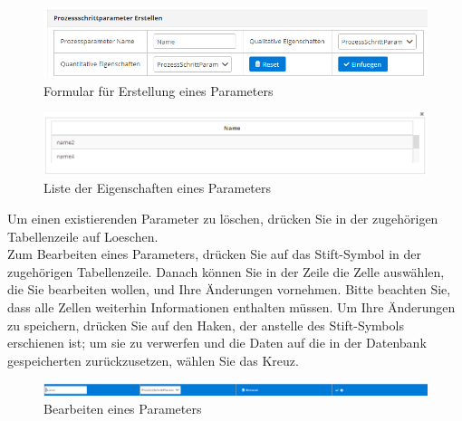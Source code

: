 \documentclass[enabledeprecatedfontcommands,fontsize=12pt,paper=a4,twoside]{scrartcl}
\begin{document}
\begin{figure}[h!]
\begin{center}
 \includegraphics[width=\textwidth]{screenshots/pk/prozessschrittparameterform.png}
  \caption{Formular für Erstellung eines Parameters}
  \label{fig:boat2}
\end{center}
\end{figure}


\begin{figure}[h!]
\begin{center}
 \includegraphics[width=\textwidth]{screenshots/pk/prozessschrittparametereigen.png}
  \caption{Liste der Eigenschaften eines Parameters}
  \label{fig:boat2}
\end{center}
\end{figure}

Um einen existierenden Parameter zu löschen, drücken Sie in der zugehörigen Tabellenzeile auf Loeschen. \\

Zum Bearbeiten eines Parameters, drücken Sie auf das Stift-Symbol in der zugehörigen Tabellenzeile. Danach können Sie in der Zeile die Zelle auswählen, die Sie bearbeiten wollen, und Ihre Änderungen vornehmen. Bitte beachten Sie, dass alle Zellen weiterhin Informationen enthalten müssen. Um Ihre Änderungen zu speichern, drücken Sie auf den Haken, der anstelle des Stift-Symbols erschienen ist; um sie zu verwerfen und die Daten auf die in der Datenbank gespeicherten zurückzusetzen, wählen Sie das Kreuz. \\

\begin{figure}[h!]
\begin{center}
 \includegraphics[width=\textwidth]{screenshots/pk/prozessschrittparameteredit.png}
  \caption{Bearbeiten eines Parameters}
  \label{fig:boat2}
\end{center}
\end{figure}
\end{document}
